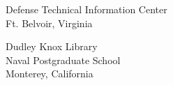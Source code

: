 \documentclass[twoside,thesis]{npsreport2018}
\begin{document}
%


%
%
\NPSend

%
\begin{distributionlist}
\item Defense Technical Information Center\\Ft. Belvoir, Virginia
\item Dudley Knox Library\\Naval Postgraduate School\\Monterey, California

\end{distributionlist}
\end{document}
